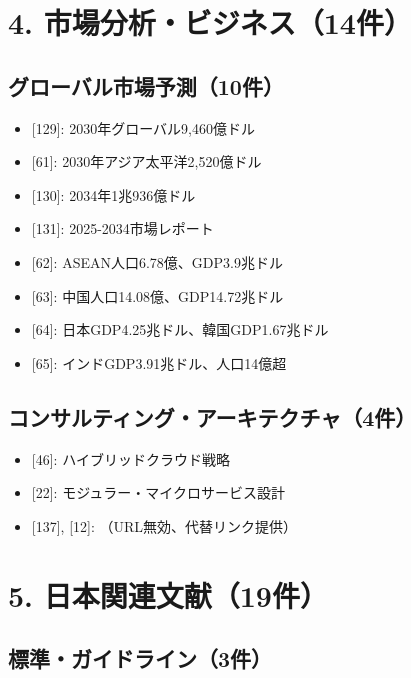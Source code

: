 \documentclass[
  a4paper,
  a4paper,
  11pt]{ltjsbook}
\providecommand{\tightlist}{%
  \setlength{\itemsep}{0pt}\setlength{\parskip}{0pt}}
\begin{document}
\section{4.
市場分析・ビジネス（14件）}\label{ux5e02ux5834ux5206ux6790ux30d3ux30b8ux30cdux30b914ux4ef6}

\subsection{グローバル市場予測（10件）}\label{ux30b0ux30edux30fcux30d0ux30ebux5e02ux5834ux4e88ux6e2c10ux4ef6}

\begin{itemize}
\tightlist
\item
  {[}129{]}: 2030年グローバル9,460億ドル
\item
  {[}61{]}: 2030年アジア太平洋2,520億ドル
\item
  {[}130{]}: 2034年1兆936億ドル
\item
  {[}131{]}: 2025-2034市場レポート
\item
  {[}62{]}: ASEAN人口6.78億、GDP3.9兆ドル
\item
  {[}63{]}: 中国人口14.08億、GDP14.72兆ドル
\item
  {[}64{]}: 日本GDP4.25兆ドル、韓国GDP1.67兆ドル
\item
  {[}65{]}: インドGDP3.91兆ドル、人口14億超
\end{itemize}

\subsection{コンサルティング・アーキテクチャ（4件）}\label{ux30b3ux30f3ux30b5ux30ebux30c6ux30a3ux30f3ux30b0ux30a2ux30fcux30adux30c6ux30afux30c1ux30e34ux4ef6}

\begin{itemize}
\tightlist
\item
  {[}46{]}: ハイブリッドクラウド戦略
\item
  {[}22{]}: モジュラー・マイクロサービス設計
\item
  {[}137{]}, {[}12{]}: （URL無効、代替リンク提供）
\end{itemize}

\section{5.
日本関連文献（19件）}\label{ux65e5ux672cux95a2ux9023ux6587ux732e19ux4ef6}

\subsection{標準・ガイドライン（3件）}\label{ux6a19ux6e96ux30acux30a4ux30c9ux30e9ux30a4ux30f33ux4ef6}
\end{document}
